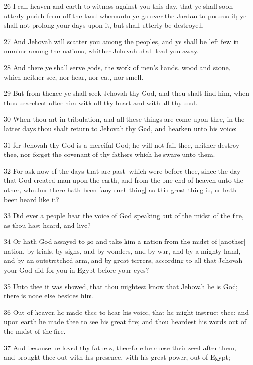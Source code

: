 \par 26 I call heaven and earth to witness against you this day, that ye shall soon utterly perish from off the land whereunto ye go over the Jordan to possess it; ye shall not prolong your days upon it, but shall utterly be destroyed.
\par 27 And Jehovah will scatter you among the peoples, and ye shall be left few in number among the nations, whither Jehovah shall lead you away.
\par 28 And there ye shall serve gods, the work of men's hands, wood and stone, which neither see, nor hear, nor eat, nor smell.
\par 29 But from thence ye shall seek Jehovah thy God, and thou shalt find him, when thou searchest after him with all thy heart and with all thy soul.
\par 30 When thou art in tribulation, and all these things are come upon thee, in the latter days thou shalt return to Jehovah thy God, and hearken unto his voice:
\par 31 for Jehovah thy God is a merciful God; he will not fail thee, neither destroy thee, nor forget the covenant of thy fathers which he sware unto them.
\par 32 For ask now of the days that are past, which were before thee, since the day that God created man upon the earth, and from the one end of heaven unto the other, whether there hath been [any such thing] as this great thing is, or hath been heard like it?
\par 33 Did ever a people hear the voice of God speaking out of the midst of the fire, as thou hast heard, and live?
\par 34 Or hath God assayed to go and take him a nation from the midst of [another] nation, by trials, by signs, and by wonders, and by war, and by a mighty hand, and by an outstretched arm, and by great terrors, according to all that Jehovah your God did for you in Egypt before your eyes?
\par 35 Unto thee it was showed, that thou mightest know that Jehovah he is God; there is none else besides him.
\par 36 Out of heaven he made thee to hear his voice, that he might instruct thee: and upon earth he made thee to see his great fire; and thou heardest his words out of the midst of the fire.
\par 37 And because he loved thy fathers, therefore he chose their seed after them, and brought thee out with his presence, with his great power, out of Egypt;
